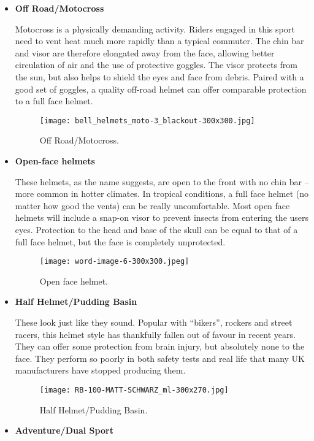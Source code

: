 \begin{itemize}
	\item\textbf{Off Road/Motocross}\vspace{.1cm}
	
	Motocross is a physically demanding activity. Riders engaged in this sport need to vent heat much more rapidly than a typical commuter. The chin bar and visor are therefore elongated away from the face, allowing better circulation of air and the use of protective goggles. The visor protects from the sun, but also helps to shield the eyes and face from debris. Paired with a good set of goggles, a quality off-road helmet can offer comparable protection to a full face helmet.
	\begin{figure}[h]
		\centering
		\texttt{[image: bell\_helmets\_moto-3\_blackout-300x300.jpg]}
		\caption{Off Road/Motocross.}
	\end{figure}
	
	\item\textbf{Open-face helmets} \vspace{0.1cm}
	
	These helmets, as the name suggests, are open to the front with no chin bar – more common in hotter climates. In tropical conditions, a full face helmet (no matter how good the vents) can be really uncomfortable. Most open face helmets will include a snap-on visor to prevent insects from entering the users eyes. Protection to the head and base of the skull can be equal to that of a full face helmet, but the face is completely unprotected.
	\begin{figure}[h]
		\centering
		\texttt{[image: word-image-6-300x300.jpeg]}
		\caption{Open face helmet.}
	\end{figure}
	
	\item\textbf{Half Helmet/Pudding Basin} \vspace{.1cm}
	
	These look just like they sound. Popular with “bikers”, rockers and street racers, this helmet style has thankfully fallen out of favour in recent years. They can offer some protection from brain injury, but absolutely none to the face. They perform so poorly in both safety tests and real life that many UK manufacturers have stopped producing them.
	\begin{figure}[h]
		\centering
		\texttt{[image: RB-100-MATT-SCHWARZ\_ml-300x270.jpg]}
		\caption{Half Helmet/Pudding Basin.}
	\end{figure}
	
	\item\textbf{Adventure/Dual Sport}\vspace{.1cm}
	

\end{itemize}
